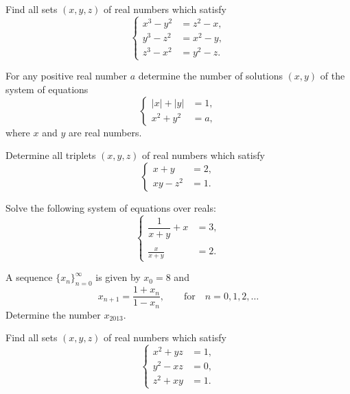\begin{question}[name={2004 Denmark (Georg Mohr)}]
    Find all sets $(x,y,z)$ of real numbers which satisfy
    \[\begin{cases}
        x^3 - y^2 &= z^2 -x, \\ y^3 - z^2 &= x^2 - y,\\ z^3 - x^2 &= y^2 - z.
    \end{cases}\]
\end{question}



\begin{question}[name={2005 Denmark (Georg Mohr)}]
    For any positive real number $a$ determine the number of solutions $(x,y)$ of the system of equations
    \[\begin{cases}
        |x| + |y| &= 1, \\ x^2 + y^2 &= a,
    \end{cases}\]
    where $x$ and $y$ are real numbers.
\end{question}



\begin{question}[name={2006 Denmark (Georg Mohr)}]
    Determine all triplets $(x,y,z)$ of real numbers which satisfy
    \[\begin{cases}
        x+y &= 2, \\ xy - z^2 &= 1.
    \end{cases}\]
\end{question}



\begin{question}[name={2009 Denmark (Georg Mohr)}]
    Solve the following system of equations over reals:
    \[\begin{cases}
        \dfrac{1}{x+y} + x &= 3, \\ & \\  \displaystyle \frac{x}{x+y} &= 2.
    \end{cases}\]
\end{question}


\begin{question}[name={2013 Denmark (Georg Mohr)}]
    A sequence $\{x_n\}_{n=0}^{\infty}$ is given by $x_0=8$ and
    \[x_{n+1} = \frac{1+x_n}{1-x_n},\qquad \text{for} \quad n=0,1,2,\dots\]
    Determine the number $x_{2013}$.
\end{question}


\begin{question}[name={2015 Denmark (Georg Mohr)}]
    Find all sets $(x,y,z)$ of real numbers which satisfy
    \[\begin{cases}
        x^2 + yz &= 1, \\ y^2 - xz &= 0,\\ z^2 + xy &= 1.
    \end{cases}\]
\end{question}



